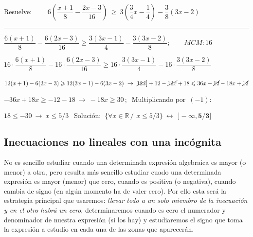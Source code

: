 \begin{miejercicio}

Resuelve: $\qquad 6\left( \dfrac{x+1}{8}-\dfrac{2x-3}{16} \right) \ \geqslant \ 3\left( \dfrac{3}{4}x-\dfrac 1 4 \right) - \dfrac 3 8 (3x-2)$

\rule{250pt}{0.1pt}	

\vspace{5mm} $\dfrac{6(x+1)}{8}-\dfrac{6(2x-3)}{16} \geqslant \dfrac{3(3x-1)}{4}-\dfrac{3(3x-2)}{8};\qquad MCM:16$

\vspace{2mm} $16\cdot \dfrac{6(x+1)}{8}-16\cdot \dfrac{6(2x-3)}{16} \geqslant 16\cdot \dfrac{3(3x-1)}{4}-16\cdot \dfrac{3(3x-2)}{8}$

\vspace{2mm} $12(x+1)-6(2x-3) \geqslant 12(3x-1)-6(3x-2) \ \to \ \cancel{12x}]+12-\cancel{12x}+18 \leqslant 36x-\cancel{12}-18x+\cancel{12}$

\vspace{2mm} $-36x+18x \geqslant -12-18 \ \to \ -18x \geqslant 30\, ; \ $ Multiplicando por $\, (-1)$:

\vspace{2mm} $18 \leqslant -30 \ \to \ x\leqslant 5/3\ \ $ Solución: $\ \{ \forall x \in \mathbb R \, / \, \ x \leqslant 5/3 \}\ \longleftrightarrow \ \ \boldsymbol{]-\infty,5/3]}$

\end{miejercicio}


\vspace{0.5cm}
\subsection{Inecuaciones no lineales con una incógnita}
\vspace{0.5cm}

No es sencillo estudiar cuando una determinada expresión algebraica es mayor (o menor) a otra, pero resulta más sencillo estudiar cuado una determinada expresión es mayor (menor) que cero, cuando es positiva (o negativa), cuando cambia de signo (en algún momento ha de valer cero). Por ello esta será la estrategia principal que usaremos: \emph{llevar todo a un solo miembro de la inecuación y en el otro habrá un cero}, determinaremos cuando es cero el numerador y denominador de nuestra expresión (si los hay) y estudiaremos el signo que toma la expresión a estudio en cada una de las zonas que aparecerán. 

